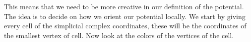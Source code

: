 This means that we need to be more creative in our definition of the potential. The idea is to decide on how we orient our potential locally. We start by giving every cell of the simplicial complex coordinates, these will be the coordinates of the smallest vertex of cell. Now look at the colors of the vertices of the cell.